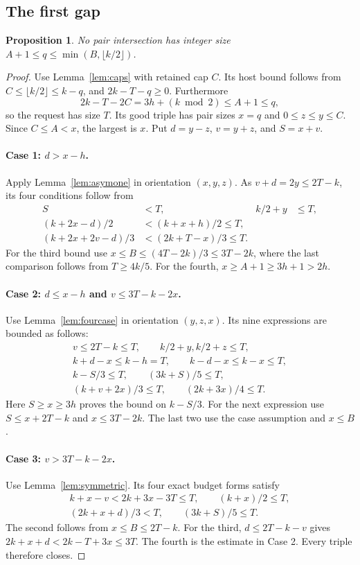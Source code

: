 \documentclass[11pt]{article}
\numberwithin{equation}{section}
\newtheorem{proposition}[theorem]{Proposition}
\theoremstyle{definition}
\theoremstyle{remark}
\begin{document}
\subsection{The first gap}
\begin{proposition}\label{prop:gapone}
No pair intersection has integer size
$A+1\le q\le\min(B,\lfloor k/2\rfloor)$.
\end{proposition}
\begin{proof}
Use Lemma~\ref{lem:caps} with retained cap $C$.
Its host bound follows from $C\le\lfloor k/2\rfloor\le k-q$, and
$2k-T-q\ge0$. Furthermore
\[
 2k-T-2C=3h+(k\bmod2)\le A+1\le q,
\]
so the request has size $T$. Its good triple has pair sizes
$x=q$ and $0\le z\le y\le C$. Since $C\le A<x$, the largest is $x$.
Put $d=y-z$, $v=y+z$, and $S=x+v$.

\paragraph{Case 1: $d>x-h$.}
Apply Lemma~\ref{lem:asymone} in orientation $(x,y,z)$.
As $v+d=2y\le2T-k$, its four conditions follow from
\begin{align*}
 S&<T,&k/2+y&\le T,\\
 (k+2x-d)/2&<(k+x+h)/2\le T,\\
 (k+2x+2v-d)/3&<(2k+T-x)/3\le T.
\end{align*}
For the third bound use
$x\le B\le(4T-2k)/3\le3T-2k$, where the last comparison follows from
$T\ge4k/5$. For the fourth, $x\ge A+1\ge3h+1>2h$.

\paragraph{Case 2: $d\le x-h$ and $v\le3T-k-2x$.}
Use Lemma~\ref{lem:fourcase} in orientation $(y,z,x)$.
Its nine expressions are bounded as follows:
\begin{gather*}
 v\le2T-k\le T,\qquad k/2+y, k/2+z\le T,\\
 k+d-x\le k-h=T,\qquad k-d-x\le k-x\le T,\\
 k-S/3\le T,\qquad (3k+S)/5\le T,\\
 (k+v+2x)/3\le T,\qquad (2k+3x)/4\le T.
\end{gather*}
Here $S\ge x\ge3h$ proves the bound on $k-S/3$.
For the next expression use $S\le x+2T-k$ and $x\le3T-2k$.
The last two use the case assumption and $x\le B$.

\paragraph{Case 3: $v>3T-k-2x$.}
Use Lemma~\ref{lem:symmetric}. Its four exact budget forms satisfy
\[
 \begin{gathered}
 k+x-v<2k+3x-3T\le T,\qquad (k+x)/2\le T,\\
 (2k+x+d)/3<T,\qquad(3k+S)/5\le T.
 \end{gathered}
\]
The second follows from $x\le B\le2T-k$. For the third,
$d\le2T-k-v$ gives $2k+x+d<2k-T+3x\le3T$.
The fourth is the estimate in Case 2. Every triple therefore closes.
\end{proof}
\end{document}
